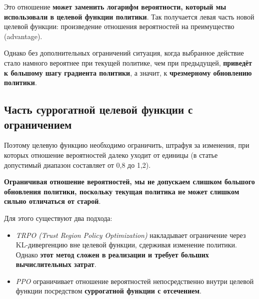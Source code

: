 \documentclass[11pt,a4paper]{article}
\begin{document}

Это отношение \textbf{может заменить логарифм вероятности, который мы использовали в целевой функции политики}. Так получается левая часть новой целевой функции: произведение отношения вероятностей на преимущество (advantage).


Однако без дополнительных ограничений ситуация, когда выбранное действие стало намного вероятнее при текущей политике, чем при предыдущей, \textbf{приведёт к большому шагу градиента политики}, а значит, к \textbf{чрезмерному обновлению политики}.

\subsection{Часть суррогатной целевой функции с ограничением}\label{the-clipped-part-of-the-clipped-surrogate-objective-function}


Поэтому целевую функцию необходимо ограничить, штрафуя за изменения, при которых отношение вероятностей далеко уходит от единицы (в статье допустимый диапазон составляет от 0{,}8 до 1{,}2).

\textbf{Ограничивая отношение вероятностей, мы не допускаем слишком большого обновления политики, поскольку текущая политика не может слишком сильно отличаться от старой}.

Для этого существуют два подхода:

\begin{itemize}
\tightlist
\item
  \emph{TRPO (Trust Region Policy Optimization)} накладывает ограничение через KL-дивергенцию вне целевой функции, сдерживая изменение политики. Однако \textbf{этот метод сложен в реализации и требует больших вычислительных затрат}.
\item
  \emph{PPO} ограничивает отношение вероятностей непосредственно внутри целевой функции посредством \textbf{суррогатной функции с отсечением}.
\end{itemize}
\end{document}
